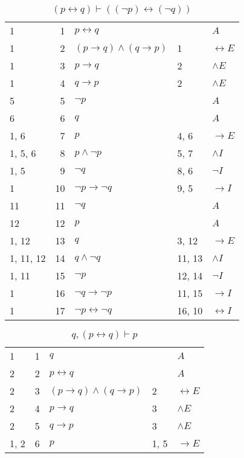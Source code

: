 \documentclass{article}
\begin{document}
\begin{table}[htbp]\caption*{$(p↔q) ⊢ ((¬p)↔(¬q))$}\centering\begin{tabular}{lrlll}
{1} & 1 & $p↔q$ & {} & $A$ \\
{1} & 2 & $(p→q)∧(q→p)$ & {1} & $↔E$ \\
{1} & 3 & $p→q$ & {2} & $∧E$ \\
{1} & 4 & $q→p$ & {2} & $∧E$ \\
{5} & 5 & $¬p$ & {} & $A$ \\
{6} & 6 & $q$ & {} & $A$ \\
{1, 6} & 7 & $p$ & {4, 6} & $→E$ \\
{1, 5, 6} & 8 & $p∧ ¬p$ & {5, 7} & $∧I$ \\
{1, 5} & 9 & $¬q$ & {8, 6} & $¬I$ \\
{1} & 10 & $¬p→ ¬q$ & {9, 5} & $→I$ \\
{11} & 11 & $¬q$ & {} & $A$ \\
{12} & 12 & $p$ & {} & $A$ \\
{1, 12} & 13 & $q$ & {3, 12} & $→E$ \\
{1, 11, 12} & 14 & $q∧ ¬q$ & {11, 13} & $∧I$ \\
{1, 11} & 15 & $¬p$ & {12, 14} & $¬I$ \\
{1} & 16 & $¬q→ ¬p$ & {11, 15} & $→I$ \\
{1} & 17 & $¬p↔ ¬q$ & {16, 10} & $↔I$ \\
\end{tabular}
\end{table}
\begin{table}[htbp]\caption*{$q,(p↔q) ⊢ p$}\centering\begin{tabular}{lrlll}
{1} & 1 & $q$ & {} & $A$ \\
{2} & 2 & $p↔q$ & {} & $A$ \\
{2} & 3 & $(p→q)∧(q→p)$ & {2} & $↔E$ \\
{2} & 4 & $p→q$ & {3} & $∧E$ \\
{2} & 5 & $q→p$ & {3} & $∧E$ \\
{1, 2} & 6 & $p$ & {1, 5} & $→E$ \\
\end{tabular}
\end{table}
\end{document}
